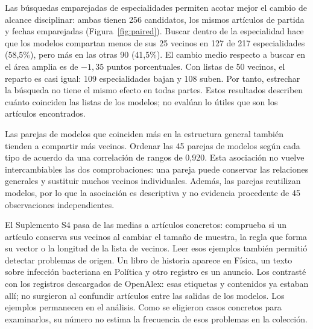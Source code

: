 \documentclass[12pt]{article}
\begin{document}
Las búsquedas emparejadas de especialidades permiten acotar mejor el cambio de alcance disciplinar: ambas tienen 256 candidatos, los mismos artículos de partida y fechas emparejadas (Figura~\ref{fig:paired}). Buscar dentro de la especialidad hace que los modelos compartan menos de sus 25 vecinos en 127 de 217 especialidades (58,5\%), pero más en las otras 90 (41,5\%). El cambio medio respecto a buscar en el área amplia es de $-1,35$ puntos porcentuales. Con listas de 50 vecinos, el reparto es casi igual: 109 especialidades bajan y 108 suben. Por tanto, estrechar la búsqueda no tiene el mismo efecto en todas partes. Estos resultados describen cuánto coinciden las listas de los modelos; no evalúan lo útiles que son los artículos encontrados.

Las parejas de modelos que coinciden más en la estructura general también tienden a compartir más vecinos. Ordenar las 45 parejas de modelos según cada tipo de acuerdo da una correlación de rangos de 0,920. Esta asociación no vuelve intercambiables las dos comprobaciones: una pareja puede conservar las relaciones generales y sustituir muchos vecinos individuales. Además, las parejas reutilizan modelos, por lo que la asociación es descriptiva y no evidencia procedente de 45 observaciones independientes.

El Suplemento S4 pasa de las medias a artículos concretos: comprueba si un artículo conserva sus vecinos al cambiar el tamaño de muestra, la regla que forma su vector o la longitud de la lista de vecinos. Leer esos ejemplos también permitió detectar problemas de origen. Un libro de historia aparece en Física, un texto sobre infección bacteriana en Política y otro registro es un anuncio. Los contrasté con los registros descargados de OpenAlex: esas etiquetas y contenidos ya estaban allí; no surgieron al confundir artículos entre las salidas de los modelos. Los ejemplos permanecen en el análisis. Como se eligieron casos concretos para examinarlos, su número no estima la frecuencia de esos problemas en la colección.
\end{document}
